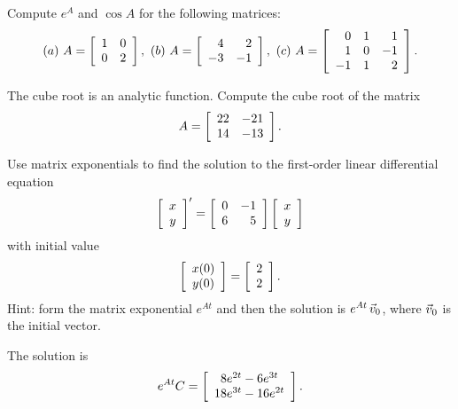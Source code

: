 \documentclass{ximera}
\author{Zack Reed}
\begin{document}
\begin{exercise}
  Compute $e^A$ and $\cos A$ for the following matrices:
  \begin{equation*}
    (a)\quad
    A = \startmat{rr}
      1 & 0 \\
      0 & 2 \\
    \stopmat,
    \quad
    (b)\quad
    A = \startmat{rr}
      4  & 2  \\
      -3 & -1 \\
    \stopmat,
    \quad
    (c)\quad
    A = \startmat{rrr}
      0 & 1 & 1 \\
      1 & 0 & -1 \\
      -1 & 1 & 2 \\
    \stopmat.
  \end{equation*}
\end{exercise}

\begin{exercise}
  The cube root is an analytic function. Compute the cube root of the
  matrix
  \begin{equation*}
    A = \startmat{rr}
      22 & -21 \\
      14 & -13 \\
    \stopmat.
  \end{equation*}
\end{exercise}

\begin{exercise}
  Use matrix exponentials to find the solution to the
  first-order linear differential equation
  \begin{equation*}
    \startmat{c}
      x \\
      y
    \stopmat^{\prime} = \startmat{rr}
      0 & -1 \\
      6 & 5
    \stopmat \startmat{c}
      x \\
      y
    \stopmat
  \end{equation*}
  with initial value
  \begin{equation*}
    \startmat{c}
      x(0) \\
      y(0)
    \stopmat = \startmat{r}
      2 \\
      2
    \stopmat.
  \end{equation*}
  Hint: form the matrix exponential $e^{At}$ and then the solution is
  $e^{At}\,\vect{v}_0$, where $\vect{v}_0$ is the initial vector.
  \begin{solution}
    The solution is
    \begin{equation*}
      e^{At}C = \startmat{c}
        8e^{2t} - 6e^{3t} \\
        18e^{3t} - 16e^{2t}
      \stopmat.
    \end{equation*}
  \end{solution}
\end{exercise}
\end{document}
